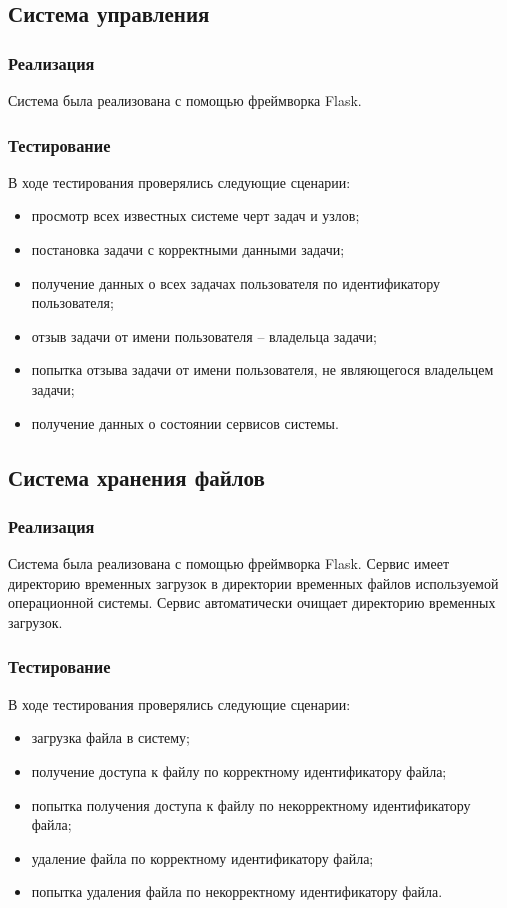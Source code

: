 \documentclass[a4paper,12pt]{report}
\numberwithin{equation}{section}
\begin{document}
  \subsection{Система управления}
  \subsubsection{Реализация}
  Система была реализована с помощью фреймворка Flask.
  
  \subsubsection{Тестирование}
  В ходе тестирования проверялись следующие сценарии:
  
  \begin{itemize}
    \item просмотр всех известных системе черт задач и узлов;
    \item постановка задачи с корректными данными задачи;
    \item получение данных о всех задачах пользователя по идентификатору пользователя;
    \item отзыв задачи от имени пользователя -- владельца задачи;
    \item попытка отзыва задачи от имени пользователя, не являющегося владельцем задачи;    
    \item получение данных о состоянии сервисов системы.
  \end{itemize}
  
  \subsection{Система хранения файлов}
  \subsubsection{Реализация}
  Система была реализована с помощью фреймворка Flask.
  Сервис имеет директорию временных загрузок в директории временных файлов используемой операционной системы.
  Сервис автоматически очищает директорию временных загрузок.
  
  \subsubsection{Тестирование}
  В ходе тестирования проверялись следующие сценарии:
  
  \begin{itemize}
    \item загрузка файла в систему;
    \item получение доступа к файлу по корректному идентификатору файла;
    \item попытка получения доступа к файлу по некорректному идентификатору файла;
    \item удаление файла по корректному идентификатору файла;
    \item попытка удаления файла по некорректному идентификатору файла.
  \end{itemize}
  
\end{document}
